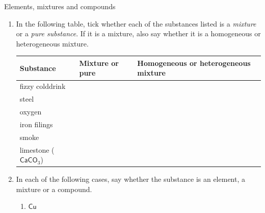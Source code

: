 \par \label{m38708*secfhsst!!!underscore!!!id212}
            \begin{exercises}{Elements, mixtures and compounds}{
            \nopagebreak
            \label{m38708*id63472}
 \begin{enumerate}[noitemsep, label=\textbf{\arabic*}. ] 
            \label{m38708*uid28}
    \item In the following table, tick whether each of the substances listed is a \textsl{mixture} or a \textsl{pure substance}. If it is a mixture, also say whether it is a homogeneous or heterogeneous mixture.
          \begin{table}[H]
        \begin{center}
      \label{m38708*id63499}
    \noindent
      \begin{tabular}{|l|l|l|}\hline
        \textbf{Substance} &
        \textbf{Mixture or pure} &
        \textbf{Homogeneous or heterogeneous mixture} \\ \hline
        fizzy colddrink & & \\ \hline
        steel & & \\ \hline
        oxygen & & \\ \hline
        iron filings & & \\ \hline
        smoke & & \\ \hline
        limestone (${\mathsf{CaCO}}_{3}$) & & \\ \hline
    \end{tabular}
      \end{center}
\end{table}
    \par
\label{m38708*uid29}\item In each of the following cases, say whether the substance is an element, a mixture or a compound.
\label{m38708*id63912}\begin{enumerate}[noitemsep, label=\textbf{\alph*}. ] 
            \label{m38708*uid30}\item $\mathsf{Cu}$

\end{enumerate}
\end{enumerate}}
\end{exercises}
